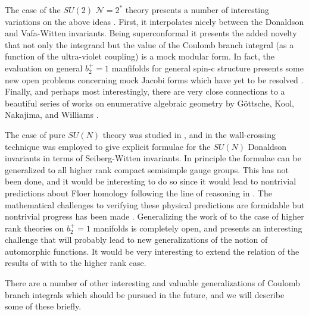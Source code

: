 \documentclass[12pt]{article}
\newcommand\CalN{\mathcal{N}}
\begin{document}
The case of the $SU(2)$ ${\CalN}=2^{*}$ theory presents a number of interesting variations 
on the above ideas \cite{Manschot:2021qqe}. First, it interpolates 
nicely between the Donaldson and Vafa-Witten invariants. Being superconformal 
it presents the added 
novelty that not only the integrand but the value of the Coulomb branch 
integral (as a function of the ultra-violet coupling) is a mock modular form. 
In fact,   the evaluation 
  on general $b_{2}^{+}=1$ manfifolds for general spin-c structure 
presents some new open problems concerning mock Jacobi forms which have
yet to be resolved \cite{Manschot:2021qqe}. Finally, and perhaps most 
interestingly, there are very close connections to a beautiful   
series of works on enumerative algebraic
geometry by  G{\"o}ttsche, Kool, Nakajima, and Williams \cite{Gottsche:2010ig,Gottsche:2020ale}. 


The case of pure $SU(N)$ theory was studied in \cite{Losev:1998,Marino:1998bm}, 
and in \cite{Marino:1998bm} the wall-crossing technique was employed to give 
explicit formulae for the $SU(N)$ Donaldson invariants in terms of Seiberg-Witten 
invariants. In principle the formulae can be generalized to all higher rank compact 
semisimple gauge groups. This has not been done, and it would be interesting to do so
since it would lead to nontrivial predictions about Floer homology following the line 
of reasoning in \cite{Marino:1998eg,AliakbarDaemi}. 
The mathematical challenges to verifying these physical predictions are formidable but nontrivial progress has been made \cite{KronheimerHigherRank,AliakbarDaemi}. Generalizing the work of 
\cite{Korpas:2017qdo,Korpas:2019ava,Korpas:2019cwg,Manschot:2021qqe}  to the case of 
higher rank theories on $b_{2}^{+}=1$ manifolds is completely open, and presents an 
interesting challenge that will probably lead to new generalizations of the notion of 
automorphic functions. It would be very interesting to extend the relation of the results of \cite{Manschot:2021qqe} with \cite{Gottsche:2010ig,Gottsche:2020ale} to the higher rank case. 

 
There are a number of other interesting and valuable generalizations of Coulomb branch 
integrals which should be pursued in the future, and we will describe some of these briefly. 
\end{document}

